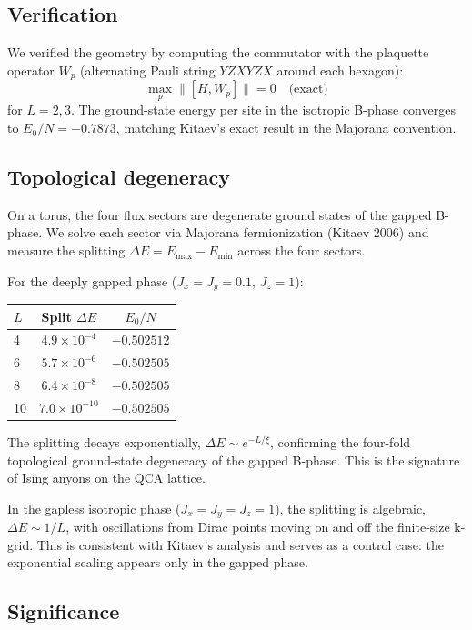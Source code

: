 \documentclass[11pt,aps,prl,twocolumn]{revtex4-2}
\begin{document}
\subsection{Verification}

We verified the geometry by computing the commutator with the
plaquette operator $W_p$ (alternating Pauli string
$Y Z X Y Z X$ around each hexagon):
\begin{equation}
\max_{p} \|[H, W_p]\| = 0 \quad \text{(exact)}
\end{equation}
for $L = 2, 3$.  The ground-state energy per site in the
isotropic B-phase converges to $E_0/N = -0.7873$, matching
Kitaev's exact result in the Majorana convention.

\subsection{Topological degeneracy}

On a torus, the four flux sectors are degenerate ground states
of the gapped B-phase.  We solve each sector via Majorana
fermionization (Kitaev 2006) and measure the splitting
$\Delta E = E_{\max} - E_{\min}$ across the four sectors.

For the deeply gapped phase ($J_x = J_y = 0.1$, $J_z = 1$):
\begin{center}
\begin{tabular}{lcc}
\hline
$L$ & Split $\Delta E$ & $E_0/N$ \\
\hline
4  & $4.9 \times 10^{-4}$ & $-0.502512$ \\
6  & $5.7 \times 10^{-6}$ & $-0.502505$ \\
8  & $6.4 \times 10^{-8}$ & $-0.502505$ \\
10 & $7.0 \times 10^{-10}$ & $-0.502505$ \\
\hline
\end{tabular}
\end{center}
The splitting decays exponentially, $\Delta E \sim e^{-L/\xi}$,
confirming the four-fold topological ground-state degeneracy of
the gapped B-phase.  This is the signature of Ising anyons on
the QCA lattice.

In the gapless isotropic phase ($J_x = J_y = J_z = 1$), the
splitting is algebraic, $\Delta E \sim 1/L$, with oscillations
from Dirac points moving on and off the finite-size k-grid.
This is consistent with Kitaev's analysis and serves as a
control case: the exponential scaling appears only in the
gapped phase.

\subsection{Significance}
\end{document}
